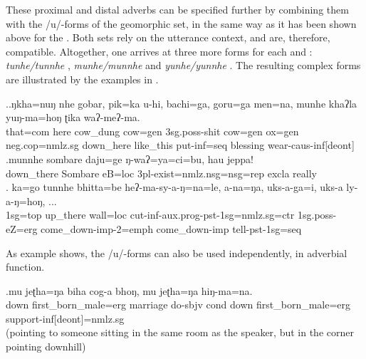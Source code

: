 These proximal and distal adverbs can be specified further by combining them with the /u/-forms of the geomorphic set, in the same way as it has been shown above for the . Both sets rely on the utterance context, and are, therefore, compatible. Altogether, one arrives at three more forms for each   and : \emph{tunhe/tunnhe} , \emph{munhe/munnhe}  and \emph{yunhe/yunnhe} . The resulting complex forms are illustrated by the examples in \Next. 

\ex.\ag.\label{tikamunhe}ŋkha=nuŋ   nhe  gobar,   pik=ka    u-hi,    bachi=ga,        goru=ga    men=na,    munhe     khaʔla   yuŋ-ma=hoŋ      ʈika    waʔ-meʔ-ma.\\
that{\sc =com} here cow\_dung cow{\sc =gen} {\sc 3sg.poss-}shit cow{\sc =gen} ox{\sc =gen} {\sc neg.cop=nmlz.sg} down\_here like\_this put{\sc -inf=seq} blessing wear{\sc -caus-inf[deont]}\\
 
\bg.munnhe     sombare  daju=ge            ŋ-waʔ=ya=ci=bu,                      hau   jeppa!\\
down\_there Sombare eB{\sc =loc} {\sc 3pl-}exist{\sc =nmlz.nsg=nsg=rep} {\sc excla} really\\
 
\bg. ka=go      tunnhe   bhitta=be    heʔ-ma-sy-a-ŋ=na=le,   a-na=ŋa,     uks-a-ga=i,       uks-a ly-a-ŋ=hoŋ, ...\\
{\sc 1sg=top} up\_there wall{\sc =loc} cut{\sc -inf-aux.prog-pst-1sg=nmlz.sg=ctr} {\sc 1sg.poss-}eZ{\sc =erg} come\_down{\sc -imp-2=emph} come\_down{\sc -imp} tell{\sc -pst-1sg=seq}\\
 

As example \Next shows, the /u/-forms can also be used independently, in adverbial function. 

\exg.mu     jeʈha=ŋa   biha     cog-a             bhoŋ, mu     jeʈha=ŋa            hiŋ-ma=na.\\
down first\_born\_male{\sc =erg} marriage do{\sc [3sg]-sbjv} {\sc cond} down first\_born\_male{\sc =erg} support{\sc -inf[deont]=nmlz.sg}\\
 (pointing to someone sitting in the same room as the speaker, but in the corner pointing downhill) 


